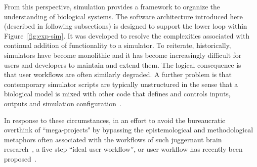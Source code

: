 \documentclass[11pt,3p,twocolumn]{JMN}
\begin{document}
From this perspective, simulation provides a framework to organize the understanding of biological systems. The software architecture introduced here (described in following subsections) is designed to support the lower loop within Figure~\ref{fig:exp-sim}. It was developed to resolve the complexities associated with continual addition of functionality to a simulator. To reiterate, historically, simulators have become monolithic and it has become increasingly difficult for users and developers to maintain and extend them. The logical consequence is that user workflows are often similarly degraded. A further problem is that contemporary simulator scripts are typically unstructured in the sense that a biological model is mixed with other code that defines and controls inputs, outputs and simulation configuration~\citep{cannon07:_inter}.

In response to these circumstances, in an effort to avoid the bureaucratic overthink of ``mega-projects" by bypassing the epistemological and methodological metaphors often associated with the workflows of such juggernaut brain research~\citep{fan19}, a five step “ideal user workflow”, or user workflow has recently been proposed~\citep{cornelis12}. 
\end{document}
